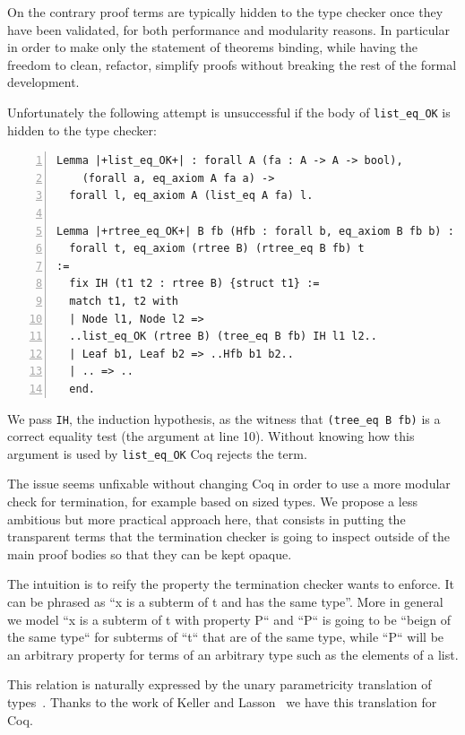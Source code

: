 \documentclass[sigplan,10pt,review]{acmart}\settopmatter{printfolios=true,printccs=false,printacmref=false}
\begin{document}
On the contrary proof terms are typically hidden to the type checker once
they have been validated, for both performance and modularity reasons.
In particular in order
to make only the statement of theorems binding, while having
the freedom to clean, refactor, simplify proofs without breaking
the rest of the formal development. 

Unfortunately the following attempt is unsuccessful if the body of
\lstinline+list_eq_OK+ is hidden to the type checker:

\begin{lstlisting}[numbers=left]
Lemma |+list_eq_OK+| : forall A (fa : A -> A -> bool),
    (forall a, eq_axiom A fa a) ->
  forall l, eq_axiom A (list_eq A fa) l.

Lemma |+rtree_eq_OK+| B fb (Hfb : forall b, eq_axiom B fb b) :
  forall t, eq_axiom (rtree B) (rtree_eq B fb) t
:= 
  fix IH (t1 t2 : rtree B) {struct t1} :=
  match t1, t2 with
  | Node l1, Node l2 =>
  ..list_eq_OK (rtree B) (tree_eq B fb) IH l1 l2..
  | Leaf b1, Leaf b2 => ..Hfb b1 b2..
  | .. => ..
  end.
\end{lstlisting}

\noindent
We pass \lstinline+IH+, the induction hypothesis, as the
witness that \lstinline+(tree_eq B fb)+ is a correct equality test
(the argument at line 10). Without knowing how this argument is used
by \lstinline+list_eq_OK+ Coq rejects the term.

The issue seems unfixable without changing Coq in order to use a more
modular check for termination, for example based on sized
types\cite{sacchini:pastel-00622429}.
We propose a less ambitious but more practical approach here, that
consists in putting the transparent terms that the termination checker
is going to inspect outside of the main proof bodies so that they can be 
kept opaque.

The intuition is to reify the property the termination checker wants
to enforce. It can be phrased as ``x is a subterm of t and has the same
type''. More in general we model ``x is a subterm of t with property
P`` and ``P`` is going to be ``beign of the same type`` for subterms
of ``t`` that are of the same type, while ``P`` will be an arbitrary
property for terms of an arbitrary type such as the elements of
a list.

This relation is naturally expressed by the unary parametricity
translation of types~\cite{Wadler:1989:TF:99370.99404}.
Thanks to the work of Keller and
Lasson~\cite{keller:hal-00730913} we have this translation for Coq.
\end{document}
